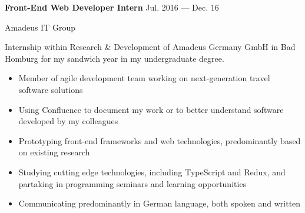 \parbox[t][][t]{\linewidth}{
	\parbox{\linewidth}{{\textbf{Front-End Web Developer Intern}}
		\hfill {{Jul. 2016 --- Dec. 16}}}
	\smallbreak
    
	\parbox{\linewidth}{Amadeus IT Group}
    
	\bigskip
	Internship within Research \& Development of Amadeus Germany GmbH in Bad Homburg for my sandwich year in my undergraduate degree.
    
	\bigskip
	\begin{itemize}
		\item{Member of agile development team working on next-generation travel software solutions}\\[-.6em]
		\item{Using Confluence to document my work or to better understand software developed by my colleagues}\\[-.6em]
		\item{Prototyping front-end frameworks and web technologies, predominantly based on existing research}\\[-.6em]
		\item{Studying cutting edge technologies, including TypeScript and Redux, and partaking in programming seminars and learning opportunities}\\[-.6em]
		\item{Communicating predominantly in German language, both spoken and written}\\[-.6em]
	\end{itemize}
}

